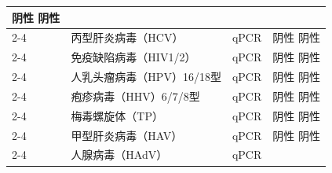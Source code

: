\documentclass[UTF8,10pt,a4paper,fontset=fandol]{ctexart}
\newcommand{\fieldvalue}[1]{#1}
\begin{document}
\begin{tabularx}{\textwidth}{|p{2.2cm}|X|p{2.0cm}|X|}
\fieldvalue{阴性}
\quad
\fieldvalue{阴性}
\\ \cline{2-4}
&
\fieldvalue{丙型肝炎病毒（HCV）}
&
\fieldvalue{qPCR}
&
\fieldvalue{阴性}
\quad
\fieldvalue{阴性}
\\ \cline{2-4}
&
\fieldvalue{免疫缺陷病毒（HIV1/2）}
&
\fieldvalue{qPCR}
&
\fieldvalue{阴性}
\quad
\fieldvalue{阴性}
\\ \cline{2-4}
&
\fieldvalue{人乳头瘤病毒（HPV）16/18型}
&
\fieldvalue{qPCR}
&
\fieldvalue{阴性}
\quad
\fieldvalue{阴性}
\\ \cline{2-4}
&
\fieldvalue{疱疹病毒（HHV）6/7/8型}
&
\fieldvalue{qPCR}
&
\fieldvalue{阴性}
\quad
\fieldvalue{阴性}
\\ \cline{2-4}
&
\fieldvalue{梅毒螺旋体（TP）}
&
\fieldvalue{qPCR}
&
\fieldvalue{阴性}
\quad
\fieldvalue{阴性}
\\ \cline{2-4}
&
\fieldvalue{甲型肝炎病毒（HAV）}
&
\fieldvalue{qPCR}
&
\fieldvalue{阴性}
\quad
\fieldvalue{阴性}
\\ \cline{2-4}
&
\fieldvalue{人腺病毒（HAdV）}
&
\fieldvalue{qPCR}
&

\end{tabularx}
\end{document}
